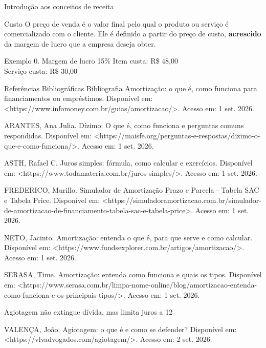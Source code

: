 \documentclass{if-beamer}
\begin{document}
	
	\begin{frame}[allowframebreaks]{Introdução aos conceitos de receita}
		\begin{block}{Custo}
			O preço de venda é o valor final pelo qual o produto ou serviço é 
			comercializado com o cliente. Ele é definido a partir do preço de custo, 
			\textbf{acrescido} da margem de lucro que a empresa deseja obter.
		\end{block}
		
		\framebreak
		
		\begin{block}{Exemplo 0. Margem de lucro 15\%}
			Item custa: R\$ 48,00 \\
			Serviço custa: R\$ 30,00
		\end{block}
		
	\end{frame}	

	\begin{frame}{Referências Bibliográficas}
		Bibliografia
Amortização: o que é, como funciona para financiamentos ou empréstimos. Disponível em: <https://www.infomoney.com.br/guias/amortizacao/>. Acesso em: 1 set. 2026.


ARANTES, Ana Julia. Dízimo: O que é, como funciona e perguntas comuns respondidas. Disponível em: <https://maisfe.org/perguntas-e-respostas/dizimo-o-que-e-como-funciona/>. Acesso em: 1 set. 2026.


ASTH, Rafael C. Juros simples: fórmula, como calcular e exercícios. Disponível em: <https://www.todamateria.com.br/juros-simples/>. Acesso em: 1 set. 2026.


FREDERICO, Murillo. Simulador de Amortização Prazo e Parcela - Tabela SAC e Tabela Price. Disponível em: <https://simuladoramortizacao.com.br/simulador-de-amortizacao-de-financiamento-tabela-sac-e-tabela-price>. Acesso em: 1 set. 2026.


NETO, Jacinto. Amortização: entenda o que é, para que serve e como calcular. Disponível em: <https://www.fundsexplorer.com.br/artigos/amortizacao/>. Acesso em: 1 set. 2026.


SERASA, Time. Amortização: entenda como funciona e quais os tipos. Disponível em: <https://www.serasa.com.br/limpa-nome-online/blog/amortizacao-entenda-como-funciona-e-os-principais-tipos/>. Acesso em: 1 set. 2026.


Agiotagem não extingue dívida, mas limita juros a 12%


VALENÇA, João. Agiotagem: o que é e como se defender? Disponível em: <https://vlvadvogados.com/agiotagem/>. Acesso em: 2 set. 2026.



		
	\end{frame}
\end{document}

